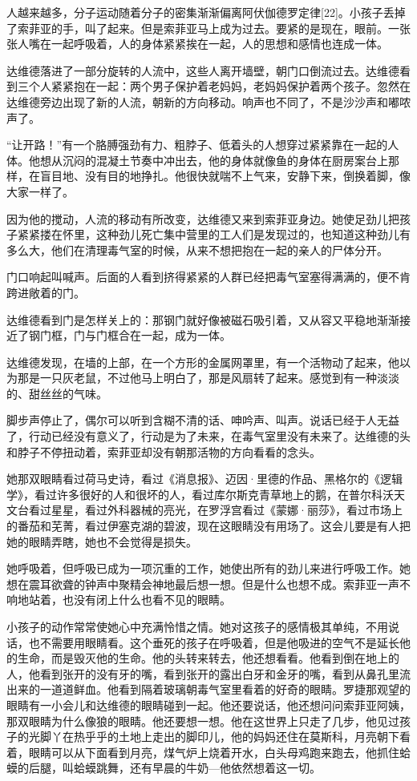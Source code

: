 人越来越多，分子运动随着分子的密集渐渐偏离阿伏伽德罗定律[22]。小孩子丢掉了索菲亚的手，叫了起来。但是索菲亚马上成为过去。要紧的是现在，眼前。一张张人嘴在一起呼吸着，人的身体紧紧挨在一起，人的思想和感情也连成一体。

达维德落进了一部分旋转的人流中，这些人离开墙壁，朝门口倒流过去。达维德看到三个人紧紧抱在一起：两个男子保护着老妈妈，老妈妈保护着两个孩子。忽然在达维德旁边出现了新的人流，朝新的方向移动。响声也不同了，不是沙沙声和嘟哝声了。

“让开路！”有一个胳膊强劲有力、粗脖子、低着头的人想穿过紧紧靠在一起的人体。他想从沉闷的混凝土节奏中冲出去，他的身体就像鱼的身体在厨房案台上那样，在盲目地、没有目的地挣扎。他很快就喘不上气来，安静下来，倒换着脚，像大家一样了。

因为他的搅动，人流的移动有所改变，达维德又来到索菲亚身边。她使足劲儿把孩子紧紧搂在怀里，这种劲儿死亡集中营里的工人们是发现过的，也知道这种劲儿有多么大，他们在清理毒气室的时候，从来不想把抱在一起的亲人的尸体分开。

门口响起叫喊声。后面的人看到挤得紧紧的人群已经把毒气室塞得满满的，便不肯跨进敞着的门。

达维德看到门是怎样关上的：那钢门就好像被磁石吸引着，又从容又平稳地渐渐接近了钢门框，门与门框合在一起，成为一体。

达维德发现，在墙的上部，在一个方形的金属网罩里，有一个活物动了起来，他以为那是一只灰老鼠，不过他马上明白了，那是风扇转了起来。感觉到有一种淡淡的、甜丝丝的气味。

脚步声停止了，偶尔可以听到含糊不清的话、呻吟声、叫声。说话已经于人无益了，行动已经没有意义了，行动是为了未来，在毒气室里没有未来了。达维德的头和脖子不停扭动着，索菲亚却没有朝那活物的方向看看的念头。

她那双眼睛看过荷马史诗，看过《消息报》、迈因·里德的作品、黑格尔的《逻辑学》，看过许多很好的人和很坏的人，看过库尔斯克青草地上的鹅，在普尔科沃天文台看过星星，看过外科器械的亮光，在罗浮宫看过《蒙娜·丽莎》，看过市场上的番茄和芜菁，看过伊塞克湖的碧波，现在这眼睛没有用场了。这会儿要是有人把她的眼睛弄瞎，她也不会觉得是损失。

她呼吸着，但呼吸已成为一项沉重的工作，她使出所有的劲儿来进行呼吸工作。她想在震耳欲聋的钟声中聚精会神地最后想一想。但是什么也想不成。索菲亚一声不响地站着，也没有闭上什么也看不见的眼睛。

小孩子的动作常常使她心中充满怜惜之情。她对这孩子的感情极其单纯，不用说话，也不需要用眼睛看。这个垂死的孩子在呼吸着，但是他吸进的空气不是延长他的生命，而是毁灭他的生命。他的头转来转去，他还想看看。他看到倒在地上的人，他看到张开的没有牙的嘴，看到张开的露出白牙和金牙的嘴，看到从鼻孔里流出来的一道道鲜血。他看到隔着玻璃朝毒气室里看着的好奇的眼睛。罗捷那观望的眼睛有一小会儿和达维德的眼睛碰到一起。他还要说话，他还想问问索菲亚阿姨，那双眼睛为什么像狼的眼睛。他还要想一想。他在这世界上只走了几步，他见过孩子的光脚丫在热乎乎的土地上走出的脚印儿，他的妈妈还住在莫斯科，月亮朝下看着，眼睛可以从下面看到月亮，煤气炉上烧着开水，白头母鸡跑来跑去，他抓住蛤蟆的后腿，叫蛤蟆跳舞，还有早晨的牛奶—他依然想着这一切。

